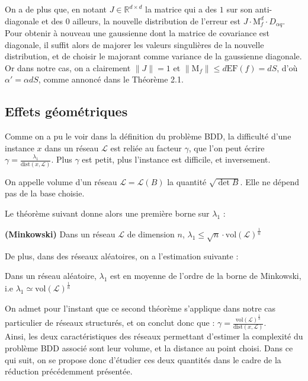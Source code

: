 \documentclass[11pt,a4paper]{article}
\begin{document}
On a de plus que, en notant $J \in \mathbb{R}^{d\times d}$ la matrice qui a des $1$ sur son anti-diagonale et des $0$ ailleurs, la nouvelle distribution de l'erreur est $J\cdot\text{M}_f^d\cdot D_{\alpha q}$. Pour obtenir à nouveau une gaussienne dont la matrice de covariance est diagonale, il suffit alors de majorer les valeurs singulières de la nouvelle distribution, et de choisir le majorant comme variance de la gaussienne diagonale. Or dans notre cas, on a clairement $\|J\|=1$ et $\|\text{M}_f\| \leq d\text{EF}(f)=dS$, d'où $\alpha'=\alpha d S$, comme annoncé dans le Théorème 2.1. \\

\subsection{Effets géométriques}

Comme on a pu le voir dans la définition du problème BDD, la difficulté d'une instance $x$ dans un réseau $\mathcal{L}$ est reliée au facteur $\gamma$, que l'on peut écrire $\gamma = \frac{\lambda_1}{\text{dist}(x,\mathcal{L})}$. Plus $\gamma$ est petit, plus l'instance est difficile, et inversement. 

\begin{defin}
On appelle volume d'un réseau $\mathcal{L}=\mathcal{L}(B)$ la quantité $\sqrt{\det{B}}$. Elle ne dépend pas de la base choisie.
\end{defin}

Le théorème suivant donne alors une première borne sur $\lambda_1$ :
\begin{theorem}\textbf{(Minkowski)}
Dans un réseau $\mathcal{L}$ de dimension $n$, $\lambda_1 \leq \sqrt{n}\cdot\text{vol}(\mathcal{L})^\frac{1}{n}$
\end{theorem}

De plus, dans des réseaux aléatoires, on a l'estimation suivante : 
\begin{theorem}
Dans un réseau aléatoire, $\lambda_1$ est en moyenne de l'ordre de la borne de Minkowski, i.e $\lambda_1 \simeq \text{vol}(\mathcal{L})^\frac{1}{n}$
\end{theorem}

On admet pour l'instant que ce second théorème s'applique dans notre cas particulier de réseaux structurés, et on conclut donc que : $\gamma = \frac{\text{vol}(\mathcal{L})^\frac{1}{n}}{\text{dist}(x,\mathcal{L})}$. \\

Ainsi, les deux caractéristiques des réseaux permettant d'estimer la complexité du problème BDD associé sont leur volume, et la distance au point choisi.  Dans ce qui suit, on se propose donc d'étudier ces deux quantités dans le cadre de la réduction précédemment présentée.
\end{document}
